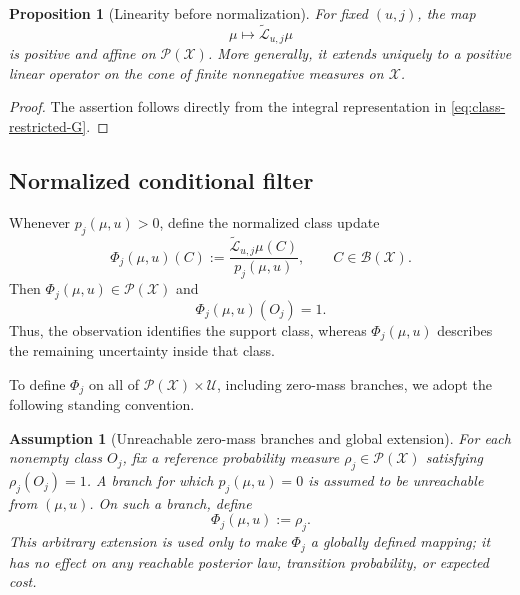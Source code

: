 \documentclass[10pt,twocolumn]{article}
\newtheorem{assumption}{Assumption}
\newtheorem{proposition}{Proposition}
\theoremstyle{remark}
\newcommand{\B}{\mathcal{B}}
\newcommand{\Pcal}{\mathcal{P}}
\newcommand{\Ucal}{\mathcal{U}}
\newcommand{\Xcal}{\mathcal{X}}
\begin{document}
\begin{proposition}[Linearity before normalization]
	\label{prop:linearity-unnormalized}
	For fixed \((u,j)\), the map
	\[
	\mu\longmapsto\widetilde{\mathcal L}_{u,j}\mu
	\]
	is positive and affine on \(\Pcal(\Xcal)\). More generally, it extends uniquely to a positive linear operator on the cone of finite nonnegative measures on \(\Xcal\).
\end{proposition}

\begin{proof}
	The assertion follows directly from the integral representation in \cref{eq:class-restricted-G}.
\end{proof}

\subsection{Normalized conditional filter}
\label{subsec:normalized-filter}

Whenever \(p_j(\mu,u)>0\), define the normalized class update
\begin{equation}
	\Phi_j(\mu,u)(C)
	:=
	\frac{\widetilde{\mathcal L}_{u,j}\mu(C)}{p_j(\mu,u)},
	\qquad C\in\B(\Xcal).
	\label{eq:normalized-class-update}
\end{equation}
Then \(\Phi_j(\mu,u)\in\Pcal(\Xcal)\) and
\begin{equation*}
	\Phi_j(\mu,u)(O_j)=1.
	\label{eq:update-supported-on-class}
\end{equation*}
Thus, the observation identifies the support class, whereas \(\Phi_j(\mu,u)\) describes the remaining uncertainty inside that class.

To define \(\Phi_j\) on all of \(\Pcal(\Xcal)\times\Ucal\), including zero-mass branches, we adopt the following standing convention.

\begin{assumption}[Unreachable zero-mass branches and global extension]
	\label{ass:zero-mass-branches}
	For each nonempty class \(O_j\), fix a reference probability measure \(\rho_j\in\Pcal(\Xcal)\) satisfying \(\rho_j(O_j)=1\). A branch for which \(p_j(\mu,u)=0\) is assumed to be unreachable from \((\mu,u)\). On such a branch, define
	\begin{equation}
		\Phi_j(\mu,u):=\rho_j.
		\label{eq:zero-mass-extension}
	\end{equation}
	This arbitrary extension is used only to make \(\Phi_j\) a globally defined mapping; it has no effect on any reachable posterior law, transition probability, or expected cost.
\end{assumption}
\end{document}
